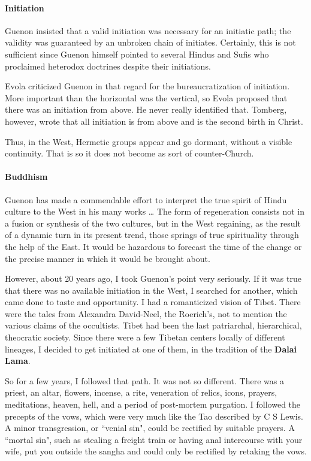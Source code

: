 \paragraph{Initiation}
Guenon insisted that a valid initiation was necessary for an initiatic path; the validity was guaranteed by an unbroken chain of initiates. Certainly, this is not sufficient since Guenon himself pointed to several Hindus and Sufis who proclaimed heterodox doctrines despite their initiations.

Evola criticized Guenon in that regard for the bureaucratization of initiation. More important than the horizontal was the vertical, so Evola proposed that there was an initiation from above. He never really identified that. Tomberg, however, wrote that all initiation is from above and is the second birth in Christ.

Thus, in the West, Hermetic groups appear and go dormant, without a visible continuity. That is so it does not become as sort of counter-Church.

\paragraph{Buddhism}
\begin{quotex}
Guenon has made a commendable effort to interpret the true spirit of Hindu culture to the West in his many works … The form of regeneration consists not in a fusion or synthesis of the two cultures, but in the West regaining, as the result of a dynamic turn in its present trend, those springs of true spirituality through the help of the East. It would be hazardous to forecast the time of the change or the precise manner in which it would be brought about. 

\end{quotex}
However, about 20 years ago, I took Guenon's point very seriously. If it was true that there was no available initiation in the West, I searched for another, which came done to taste and opportunity. I had a romanticized vision of Tibet. There were the tales from Alexandra David-Neel, the Roerich's, not to mention the various claims of the occultists. Tibet had been the last patriarchal, hierarchical, theocratic society. Since there were a few Tibetan centers locally of different lineages, I decided to get initiated at one of them, in the tradition of the \textbf{Dalai Lama}.

So for a few years, I followed that path. It was not so different. There was a priest, an altar, flowers, incense, a rite, veneration of relics, icons, prayers, meditations, heaven, hell, and a period of post-mortem purgation. I followed the precepts of the vows, which were very much like the Tao described by C S Lewis. A minor transgression, or ``venial sin", could be rectified by suitable prayers. A ``mortal sin", such as stealing a freight train or having anal intercourse with your wife, put you outside the sangha and could only be rectified by retaking the vows.

